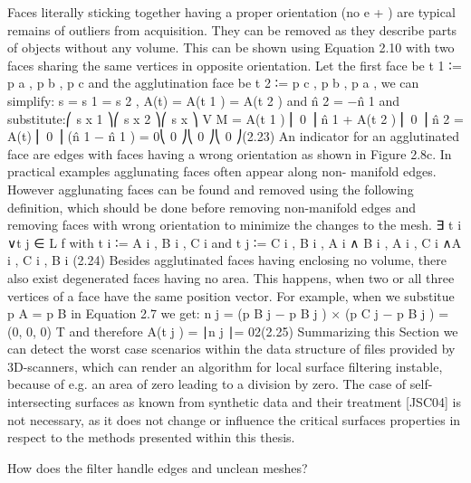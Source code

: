 \documentclass[openany]{book}
\begin{document}
Faces literally sticking together having a proper orientation (no e + ) are typical remains
of outliers from acquisition. They can be removed as they describe parts of objects
without any volume. This can be shown using Equation 2.10 with two faces sharing
the same vertices in opposite orientation. Let the first face be t 1 ∶= {p a , p b , p c } and the
agglutination face be t 2 ∶= {p c , p b , p a }, we can simplify: s = s 1 = s 2 , A(t) = 
A(t 1 ) = A(t 2 ) and n̂ 2 = −n̂ 1 and substitute:⎛ s x 1 ⎞⎛ s x 2 ⎞⎛ s x ⎞
V M = A(t 1 ) ⎜ 0 ⎟ n̂ 1 + A(t 2 ) ⎜ 0 ⎟ n̂ 2 = A(t) ⎜ 0 ⎟ (n̂ 1 − n̂ 1 ) = 0⎝ 0 ⎠⎝ 0 ⎠⎝ 0 ⎠(2.23)
An indicator for an agglutinated face are edges with faces having a wrong orientation as
shown in Figure 2.8c. In practical examples agglunating faces often appear along non-
manifold edges. However agglunating faces can be found and removed using the following
definition, which should be done before removing non-manifold edges and removing faces
with wrong orientation to minimize the changes to the mesh.
∃ t i ∨t j ∈ L f with t i ∶= {A i , B i , C i } and t j ∶= {C i , B i , A i }∧
{B i , A i , C i }∧{A i , C i , B i } (2.24)
Besides agglutinated faces having enclosing no volume, there also exist degenerated
faces having no area. This happens, when two or all three vertices of a face have the same
position vector. For example, when we substitue p A = p B in Equation 2.7 we get:
n j = (p B j − p B j ) × (p C j − p B j ) = (0, 0, 0) T and therefore A(t j ) =
∣n j ∣= 02(2.25)
Summarizing this Section we can detect the worst case scenarios within the data
structure of files provided by 3D-scanners, which can render an algorithm for local surface
filtering instable, because of e.g. an area of zero leading to a division by zero. The case
of self-intersecting surfaces as known from synthetic data and their treatment [JSC04] is
not necessary, as it does not change or influence the critical surfaces properties in respect
to the methods presented within this thesis.~\cite[p.~32]{Mara12}

How does the filter handle edges and unclean meshes?
\end{document}
